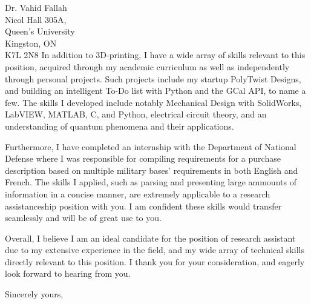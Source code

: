 \documentclass[11pt]{letter} %
\begin{document}
\begin{letter}{Dr. Vahid Fallah \\
Nicol Hall 305A, \\
Queen's University \\
Kingston, ON \\
K7L 2N8}
In addition to 3D-printing, I have a wide array of skills relevant to this position, acquired through my academic curriculum as well as independently through personal projects. Such projects include my startup PolyTwist Designs, and building an intelligent To-Do list with Python and the GCal API, to name a few. The skills I developed include notably Mechanical Design with SolidWorks, LabVIEW, MATLAB, C, and Python, electrical circuit theory, and an understanding of quantum phenomena and their applications.

Furthermore, I have completed an internship with the Department of National Defense where I was responsible for compiling requirements for a purchase description based on multiple military bases' requirements in both English and French. The skills I applied, such as parsing and presenting large ammounts of information in a concise manner, are extremely applicable to a research assistanceship position with you. I am confident these skills would transfer seamlessly and will be of great use to you.

Overall, I believe I am an ideal candidate for the position of research assistant due to my extensive experience in the field, and my wide array of technical skills directly relevant to this position. I thank you for your consideration, and eagerly look forward to hearing from you.

\closing{Sincerely yours,}


\end{letter}
\end{document}
